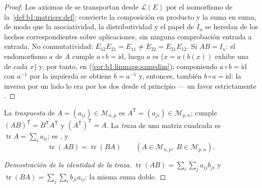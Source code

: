 \begin{proof}
Los axiomas de  se transportan desde $\mathcal{L}(E)$ por el
isomorfismo de la~\cref{def:b1:matrices:def}: convierte la composición
en producto y la suma en suma, de modo que la asociatividad, la
distributividad y el papel de $I_n$ se heredan de los hechos
correspondientes sobre aplicaciones, sin ninguna comprobación
entrada a entrada. No conmutatividad:
$E_{12}E_{21} = E_{11} \neq E_{22} = E_{21}E_{12}$. Si $AB = I_n$:
el endomorfismo $a$ de $A$ cumple $a \circ b = \mathrm{id}$, luego
$a$ es  ($x = a(b(x))$ exhibe una  de
cada $x$) y, por tanto,  en 
(\cref{cor:b1:linmaps:samedim}); componiendo
$a \circ b = \mathrm{id}$ con $a^{-1}$ por la izquierda se obtiene
$b = a^{-1}$ y, entonces, también $b\circ a = \mathrm{id}$: la
inversa por un lado lo era por los dos desde el principio --- un
favor estrictamente .
\end{proof}

\begin{definition}\label{def:b1:matrices:transpose}
La \emph{traspuesta} de $A = (a_{ij}) \in \mathcal{M}_{n,p}$ es
$A^{\mathsf T} = (a_{ji}) \in \mathcal{M}_{p,n}$; cumple
$(AB)^{\mathsf T} = B^{\mathsf T} A^{\mathsf T}$ y
$(A^{\mathsf T})^{\mathsf T} = A$. La \emph{traza} de
una matriz cuadrada es $\operatorname{tr} A = \sum_i a_{ii}$; es
, y
\[
\operatorname{tr}(AB) = \operatorname{tr}(BA)
\qquad (A \in \mathcal{M}_{n,p},\ B \in \mathcal{M}_{p,n}).
\]
\end{definition}

\begin{proof}[Demostración de la identidad de la traza]
$\operatorname{tr}(AB) = \sum_i \sum_j a_{ij} b_{ji}$ y
$\operatorname{tr}(BA) = \sum_j \sum_i b_{ji} a_{ij}$: la misma suma
doble.
\end{proof}


